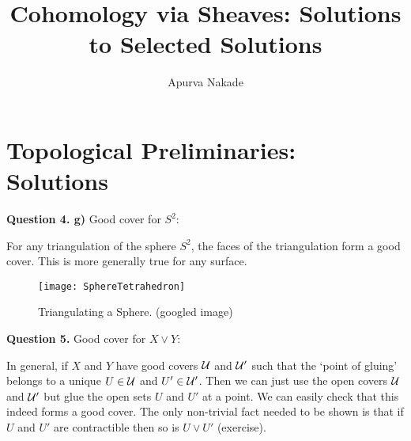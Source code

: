 
\usepackage{scrextend}


\usepackage{pgfplots}
\pgfplotsset{compat=newest}

% 

\title{Cohomology via Sheaves: Solutions to Selected Solutions}
\author{\small{Apurva Nakade}}
\date{}



\section{Topological Preliminaries: Solutions}
\vspace{3em}
\noindent \textbf{Question 4. g)} Good cover for $S^2$:\\
\begin{addmargin}[2em]{0em}
For any triangulation of the sphere $S^2$, the faces of the triangulation form a good cover. This is more generally true for any surface.
\begin{figure}[H]
		\centering
		\texttt{[image: SphereTetrahedron]}
    \caption{Triangulating a Sphere. (googled image)}
	\end{figure}
  \vspace{6em}
\end{addmargin}


\noindent \textbf{Question 5.} Good cover for $X \vee Y$:\\
\begin{addmargin}[2em]{0em}
In general, if $X$ and $Y$ have good covers $\mathcal{U}$ and $\mathcal{U}'$ such that the `point of gluing' belongs to a unique $U \in \mathcal{U}$ and $U' \in \mathcal{U}'$. Then we can just use the open covers $\mathcal{U}$ and $\mathcal{U}'$ but glue the open sets $U$ and $U'$ at a point. We can easily check that this indeed forms a good cover. The only non-trivial fact needed to be shown is that if $U$ and $U'$ are contractible then so is $U \vee U'$ (exercise).
\end{addmargin}


\newpage

